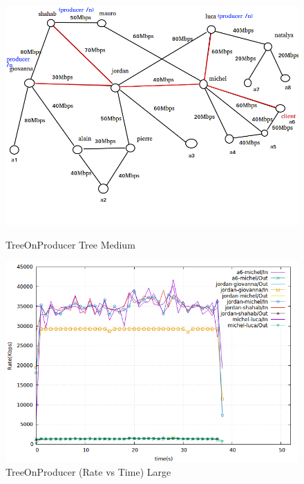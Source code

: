 \begin{figure}[H]

\begin{center}

\includegraphics[scale = 0.5]{Figures/TreeOnProducer_big.png}

\caption{TreeOnProducer Tree Medium} \label{TreeOnProducer_big} 


\includegraphics[scale = 0.5]{Figures/treeonproducer_big.png}

\caption{TreeOnProducer (Rate vs Time) Large} \label{treeonproducer_big} 


\end{center}

\end{figure}


